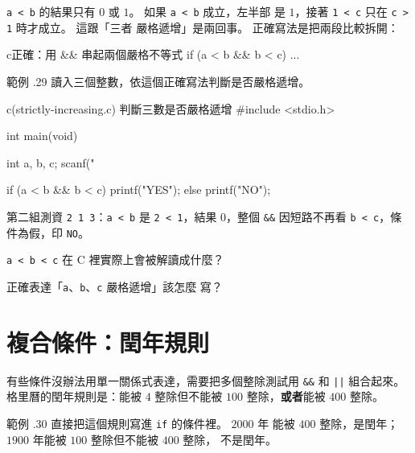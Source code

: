 \texttt{a < b} 的結果只有 $0$ 或 $1$。 如果 \texttt{a < b} 成立，左半部
是 $1$，接著 \texttt{1 < c} 只在 \texttt{c > 1} 時才成立。 這跟「三者
嚴格遞增」是兩回事。 正確寫法是把兩段比較拆開：

\begin{code}{c}{正確：用 \&\& 串起兩個嚴格不等式}
if (a < b && b < c) {
    ...
}
\end{code}

範例 \thechapter.29 讀入三個整數，依這個正確寫法判斷是否嚴格遞增。

\begin{example}{c}{(strictly-increasing.c) 判斷三數是否嚴格遞增}
#include <stdio.h>

int main(void) {
    int a, b, c;
    scanf("%

    if (a < b && b < c) {
        printf("YES\n");
    } else {
        printf("NO\n");
    }
}
\end{example}



第二組測資 \texttt{2 1 3}：\texttt{a < b} 是 \texttt{2 < 1}，結果
$0$，整個 \texttt{\&\&} 因短路不再看 \texttt{b < c}，條件為假，印
\texttt{NO}。


\begin{drills}[label=drills:cond-chained-compare]
\item \texttt{a < b < c} 在 C 裡實際上會被解讀成什麼？
\item 正確表達「\texttt{a}、\texttt{b}、\texttt{c} 嚴格遞增」該怎麼
寫？
\end{drills}

\section{複合條件：閏年規則}
\label{sec:cond-leap-year}

有些條件沒辦法用單一關係式表達，需要把多個整除測試用 \texttt{\&\&} 和
\texttt{||} 組合起來。 格里曆的閏年規則是：能被 $4$ 整除但不能被 $100$
整除，\textbf{或者}能被 $400$ 整除。

範例 \thechapter.30 直接把這個規則寫進 \texttt{if} 的條件裡。 $2000$ 年
能被 $400$ 整除，是閏年；$1900$ 年能被 $100$ 整除但不能被 $400$ 整除，
不是閏年。

